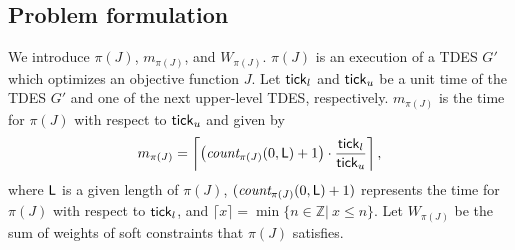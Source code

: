 \documentclass[journal,twoside,web]{IEEEtran}
\newcommand{\tick}{{\sf tick}}
\newcommand{\Len}{{\sf L}}
\begin{document}
\subsection{Problem formulation}
%
We introduce $\pi(J)$, $m_{\pi(J)}$, and $W_{\pi(J)}$. 
$\pi(J)$ is an execution of a TDES $G'$ which optimizes an objective function $J$.
Let ${\tick}_{l}$ and ${\tick}_u$ be a unit time of the TDES $G'$ and one of the next upper-level TDES, respectively.
$m_{\pi(J)}$ is the time for $\pi(J)$ with respect to ${\tick}_{u}$ and given by
\begin{align}\label{ti}
m_{\pi(J)}=\left\lceil \left(\textit{count}_{\pi(J)}(0,\Len)+1\right)\cdot\frac{{\tick}_l}{{\tick}_{u}} \right\rceil,
\end{align}
where $\Len$ is a given length of $\pi(J)$, $(\textit{count}_{\pi(J)}(0,\Len)+1 )$ represents the time for $\pi(J)$ with respect to ${\tick}_l$, and $\lceil x \rceil =\min\{n\in\mathbb{Z}|\ x\leq n\}$.
Let $W_{\pi(J)}$ be the sum of weights of soft constraints that $\pi(J)$ satisfies.
\end{document}
